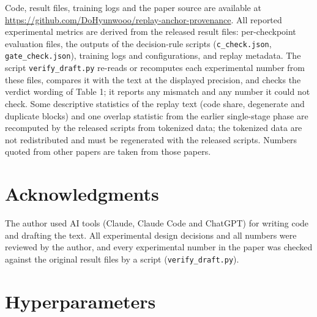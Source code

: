 \documentclass[11pt]{article}
\begin{document}
{\sloppy Code, result files, training logs and the paper source are available at \url{https://github.com/DoHyunwooo/replay-anchor-provenance}. All reported experimental metrics are derived from the released result files: per-checkpoint evaluation files, the outputs of the decision-rule scripts (\texttt{c\_check.json}, \texttt{gate\_check.json}), training logs and configurations, and replay metadata. The script \texttt{verify\_draft.py} re-reads or recomputes each experimental number from these files, compares it with the text at the displayed precision, and checks the verdict wording of Table 1; it reports any mismatch and any number it could not check. Some descriptive statistics of the replay text (code share, degenerate and duplicate blocks) and one overlap statistic from the earlier single-stage phase are recomputed by the released scripts from tokenized data; the tokenized data are not redistributed and must be regenerated with the released scripts. Numbers quoted from other papers are taken from those papers.\par}

\section*{Acknowledgments}

The author used AI tools (Claude, Claude Code and ChatGPT) for writing code and drafting the text. All experimental design decisions and all numbers were reviewed by the author, and every experimental number in the paper was checked against the original result files by a script (\texttt{verify\_draft.py}).






\appendix

\section{Hyperparameters}
\end{document}
